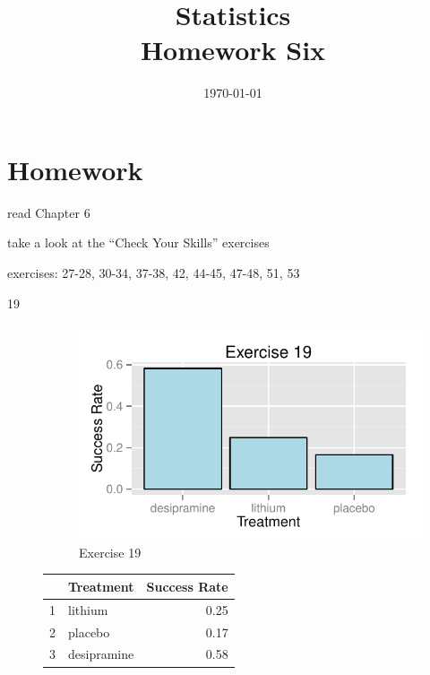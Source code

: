 \documentclass[letterpaper, landscape]{exam}
\title{Statistics \\ Homework Six}
\date{\today}
\author{}
\begin{document}
  \maketitle

  \section{Homework}
    \begin{itemize*}
      \item read Chapter 6 
      \item take a look at the ``Check Your Skills'' exercises
      \item exercises: 27-28, 30-34, 37-38, 42, 44-45, 47-48, 51, 53
    \end{itemize*}

  \ifprintanswers
    \begin{description}

      \item[19]     
        \begin{figure}[H]
          \centering
          \includegraphics{figures/ex19.pdf}
          \caption{Exercise 19}
        \end{figure}

        \begin{table}[H]
          \centering
          \begin{tabular}{rlr}
            \toprule
              & Treatment   & Success Rate \\
            \midrule
            1 & lithium     & 0.25 \\
            2 & placebo     & 0.17 \\
            3 & desipramine & 0.58 \\
            \bottomrule
          \end{tabular}
        \end{table}


\end{description}
\end{document}
